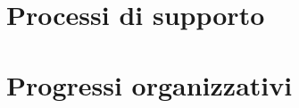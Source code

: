 \documentclass[a4paper, oneside, openany, dvipsnames, table]{article}
\begin{document}
\copertina{}

\newpage
\newpage



\section{Processi di supporto}

\section{Progressi organizzativi}

\end{document}
